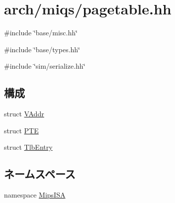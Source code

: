 \hypertarget{miqs_2pagetable_8hh}{
\section{arch/miqs/pagetable.hh}
\label{miqs_2pagetable_8hh}
}
{\ttfamily \#include \char`\"{}base/misc.hh\char`\"{}}\par
{\ttfamily \#include \char`\"{}base/types.hh\char`\"{}}\par
{\ttfamily \#include \char`\"{}sim/serialize.hh\char`\"{}}\par
\subsection*{構成}
\begin{DoxyCompactItemize}
\item 
struct \hyperlink{structMipsISA_1_1VAddr}{VAddr}
\item 
struct \hyperlink{structMipsISA_1_1PTE}{PTE}
\item 
struct \hyperlink{structMipsISA_1_1TlbEntry}{TlbEntry}
\end{DoxyCompactItemize}
\subsection*{ネームスペース}
\begin{DoxyCompactItemize}
\item 
namespace \hyperlink{namespaceMipsISA}{MipsISA}
\end{DoxyCompactItemize}
